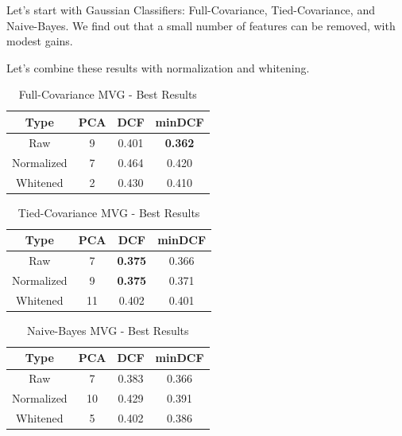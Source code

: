 \documentclass[12pt, twocolumn]{article}
\begin{document}
Let's start with Gaussian Classifiers: Full-Covariance, Tied-Covariance, and Naive-Bayes.
We find out that a small number of features can be removed, with modest gains.

Let's combine these results with normalization and whitening.

\begin{table}[H]
    \centering
        \begin{tabular}{||c|c|c|c||}
            \hline
            Type & PCA & DCF & minDCF \\
            \hline
            \hline
            Raw & 9 & 0.401 & {\bf 0.362}  \\
            Normalized &  7 & 0.464 & 0.420 \\
            Whitened & 2 & 0.430 & 0.410 \\
            \hline
    \end{tabular}
    \caption{Full-Covariance MVG - Best Results}
\end{table}

\begin{table}[H]
    \centering
        \begin{tabular}{||c|c|c|c||}
            \hline
            Type & PCA & DCF & minDCF \\
            \hline
            \hline
            Raw & 7 & {\bf 0.375} & 0.366  \\
            Normalized &  9 & {\bf 0.375} & 0.371 \\
            Whitened & 11 & 0.402 & 0.401 \\
            \hline
    \end{tabular}
    \caption{Tied-Covariance MVG - Best Results}
\end{table}

\begin{table}[H]
    \centering
        \begin{tabular}{||c|c|c|c||}
            \hline
            Type & PCA & DCF & minDCF \\
            \hline
            \hline
            Raw & 7 & 0.383 & 0.366  \\
            Normalized &  10 & 0.429 & 0.391 \\
            Whitened & 5 & 0.402 & 0.386 \\
            \hline
    \end{tabular}
    \caption{Naive-Bayes MVG - Best Results}
\end{table}
\end{document}
